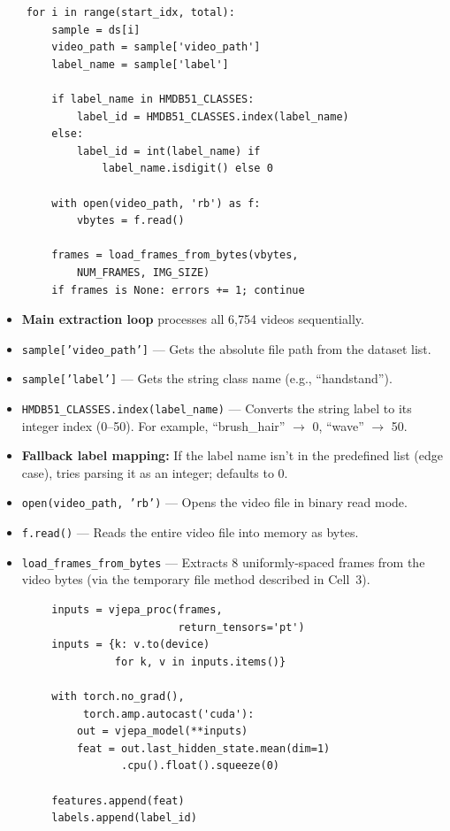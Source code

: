\begin{lstlisting}
    for i in range(start_idx, total):
        sample = ds[i]
        video_path = sample['video_path']
        label_name = sample['label']

        if label_name in HMDB51_CLASSES:
            label_id = HMDB51_CLASSES.index(label_name)
        else:
            label_id = int(label_name) if
                label_name.isdigit() else 0

        with open(video_path, 'rb') as f:
            vbytes = f.read()

        frames = load_frames_from_bytes(vbytes,
            NUM_FRAMES, IMG_SIZE)
        if frames is None: errors += 1; continue
\end{lstlisting}

\begin{explanation}
\begin{itemize}[nosep]
  \item \textbf{Main extraction loop} processes all 6,754 videos sequentially.
  \item \texttt{sample['video\_path']} --- Gets the absolute file path from the dataset list.
  \item \texttt{sample['label']} --- Gets the string class name (e.g., ``handstand'').
  \item \texttt{HMDB51\_CLASSES.index(label\_name)} --- Converts the string label to its integer index (0--50). For example, ``brush\_hair'' $\to$ 0, ``wave'' $\to$ 50.
  \item \textbf{Fallback label mapping:} If the label name isn't in the predefined list (edge case), tries parsing it as an integer; defaults to 0.
  \item \texttt{open(video\_path, 'rb')} --- Opens the video file in binary read mode.
  \item \texttt{f.read()} --- Reads the entire video file into memory as bytes.
  \item \texttt{load\_frames\_from\_bytes} --- Extracts 8 uniformly-spaced frames from the video bytes (via the temporary file method described in Cell~3).
\end{itemize}
\end{explanation}

\begin{lstlisting}
        inputs = vjepa_proc(frames,
                            return_tensors='pt')
        inputs = {k: v.to(device)
                  for k, v in inputs.items()}

        with torch.no_grad(),
             torch.amp.autocast('cuda'):
            out = vjepa_model(**inputs)
            feat = out.last_hidden_state.mean(dim=1)
                   .cpu().float().squeeze(0)

        features.append(feat)
        labels.append(label_id)
\end{lstlisting}

